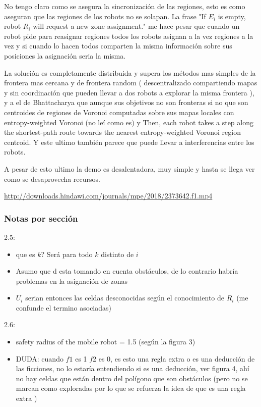 No tengo claro como se asegura la sincronización de las regiones, esto es como aseguran que las regiones de los robots no se solapan. La frase "If $E_i$ is empty, robot $R_i$ will request a new zone assignment." me hace pesar que cuando un robot pide para reasignar regiones todos los robots asignan a la vez regiones a la vez y si cuando lo hacen todos comparten la misma información sobre sus posiciones la asignación seria la misma.

La solución es completamente distribuida y supera los métodos mas simples de la frontera mas cercana y de frontera random ( descentralizado compartiendo mapas y sin coordinación que pueden llevar a dos robots a explorar la misma frontera ), y a el de Bhattacharya que aunque sus objetivos no son fronteras si no que son centroides de regiones de Voronoi computadas sobre sus mapas locales con entropy-weighted Voronoi (no leí como es) y Then, each robot takes a step along the shortest-path route towards the nearest entropy-weighted Voronoi region centroid. Y este ultimo también parece que puede llevar a interferencias entre los robots.

A pesar de esto ultimo la demo es desalentadora, muy simple y hasta se llega ver como se desaprovecha recursos.

\url{http://downloads.hindawi.com/journals/mpe/2018/2373642.f1.mp4}

\subsubsection{Notas por sección}
2.5:
\begin{itemize}
  \item que es $k$? Será para todo $k$ distinto de $i$
  \item  Asumo que d esta tomando en cuenta obstáculos, de lo contrario habría problemas en la asignación de zonas
  \item  $U_i$ serian entonces las celdas desconocidas según el conocimiento de $R_i$ (me confunde el termino asociadas)
\end{itemize}

2.6:
\begin{itemize}
  \item safety radius of the mobile robot = 1.5 (según la figura 3)
  \item DUDA: cuando $f1$ es 1 $f2$ es 0, es esto una regla extra o es una deducción de las ficciones, no lo estaría entendiendo si es una deducción, ver figura 4, ahí no hay celdas que están dentro del polígono que son obstáculos (pero no se marcan como exploradas por lo que se refuerza la idea de que es una regla extra )
\end{itemize}

